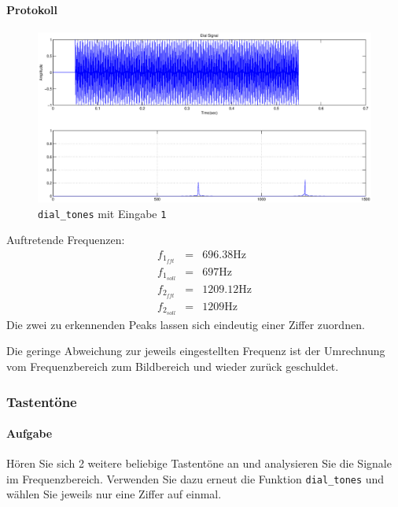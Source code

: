 \documentclass[10pt]{report}
\begin{document}
        \paragraph{Protokoll}
        \begin{center}
            \begin{figure}[H]
                \includegraphics[width=\textwidth]{img4341}
              \caption{\texttt{dial\_tones} mit Eingabe \texttt{1}}
            \end{figure}
        \end{center}
        Auftretende Frequenzen:
        \begin{eqnarray*}
            f_{1_{fft}} &=& 696.38 \si{\hertz}\\
            f_{1_{soll}} &=& 697\si{\hertz}\\
            f_{2_{fft}} &=& 1209.12\si{\hertz}\\
            f_{2_{soll}} &=& 1209\si{\hertz}
        \end{eqnarray*}
        Die zwei zu erkennenden Peaks lassen sich eindeutig einer Ziffer zuordnen.

        Die geringe Abweichung zur jeweils eingestellten Frequenz ist der Umrechnung
        vom Frequenzbereich zum Bildbereich und wieder zurück geschuldet.

        \subsubsection{Tastentöne}
        \paragraph{Aufgabe}
        Hören Sie sich 2 weitere beliebige Tastentöne an und analysieren Sie die Signale im
        Frequenzbereich. Verwenden Sie dazu erneut die Funktion \texttt{dial\_tones} und wählen
        Sie jeweils nur eine Ziffer auf einmal.
\end{document}
